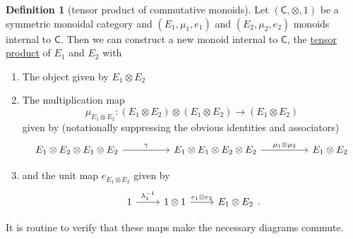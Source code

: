 \documentclass[a4paper,10pt]{scrreprt}
\newcommand{\defn}[1]{\ul{#1}}
\theoremstyle{definition}
\newtheorem{definition}{Definition}[section]
\theoremstyle{plain}
\theoremstyle{remark}
\begin{document}
\begin{definition}[tensor product of commutative monoids]
  \label{def:tensorproductofcommutativemonoids}
  Let $(\mathsf{C}, \otimes, 1)$ be a symmetric monoidal category and $(E_{1}, \mu_{1}, e_{1})$ and $(E_{2}, \mu_{2}, e_{2})$ monoids internal to $\mathsf{C}$. Then we can construct a new monoid internal to $\mathsf{C}$, the \defn{tensor product} of $E_{1}$ and $E_{2}$ with

  \begin{enumerate}
    \item The object given by $E_{1} \otimes E_{2}$

    \item The multiplication map
      \begin{equation*}
        \mu_{E_{1} \otimes E_{2}}\colon (E_{1} \otimes E_{2}) \otimes (E_{1} \otimes E_{2}) \to (E_{1} \otimes E_{2})
      \end{equation*}
      given by (notationally suppressing the obvious identities and associators)
      \begin{equation*}
        \begin{tikzcd}[column sep=huge]
          E_{1} \otimes E_{2} \otimes E_{1} \otimes E_{2} 
          \arrow[r, "\gamma"]
          & E_{1} \otimes E_{1} \otimes E_{2} \otimes E_{2}  
          \arrow[r, "\mu_{1} \otimes \mu_{2}"]
          & E_{1} \otimes E_{2}
        \end{tikzcd}
      \end{equation*}

    \item and the unit map $e_{E_{1} \otimes E_{2}}$ given by
      \begin{equation*}
        \begin{tikzcd}
          1
          \arrow[r, "\lambda^{-1}_{1}"]
          & 1 \otimes 1
          \arrow[r, "e_{1} \otimes e_{2}"]
          & E_{1} \otimes E_{2}
        \end{tikzcd}.
      \end{equation*}
  \end{enumerate}

  It is routine to verify that these maps make the necessary diagrams commute.
\end{definition}
\end{document}
